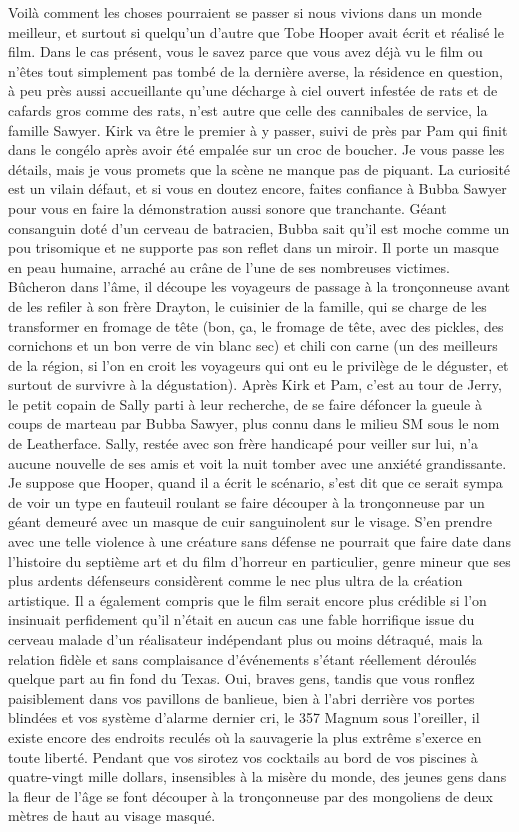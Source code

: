 Voilà comment les choses pourraient se passer si nous vivions dans un monde meilleur, et surtout si quelqu’un d’autre que Tobe Hooper avait écrit et réalisé le film. Dans le cas présent, vous le savez parce que vous avez déjà vu le film ou n’êtes tout simplement pas tombé de la dernière averse, la résidence en question, à peu près aussi accueillante qu’une décharge à ciel ouvert infestée de rats et de cafards gros comme des rats, n’est autre que celle des cannibales de service, la famille Sawyer. Kirk va être le premier à y passer, suivi de près par Pam qui finit dans le congélo après avoir été empalée sur un croc de boucher. Je vous passe les détails, mais je vous promets que la scène ne manque pas de piquant. La curiosité est un vilain défaut, et si vous en doutez encore, faites confiance à Bubba Sawyer pour vous en faire la démonstration aussi sonore que tranchante. Géant consanguin doté d’un cerveau de batracien, Bubba sait qu’il est moche comme un pou trisomique et ne supporte pas son reflet dans un miroir. Il porte un masque en peau humaine, arraché au crâne de l’une de ses nombreuses victimes. Bûcheron dans l’âme, il découpe les voyageurs de passage à la tronçonneuse avant de les refiler à son frère Drayton, le cuisinier de la famille, qui se charge de les transformer en fromage de tête (bon, ça, le fromage de tête, avec des pickles, des cornichons et un bon verre de vin blanc sec) et chili con carne (un des meilleurs de la région, si l’on en croit les voyageurs qui ont eu le privilège de le déguster, et surtout de survivre à la dégustation). Après Kirk et Pam, c’est au tour de Jerry, le petit copain de Sally parti à leur recherche, de se faire défoncer la gueule à coups de marteau par Bubba Sawyer, plus connu dans le milieu SM sous le nom de Leatherface. Sally, restée avec son frère handicapé pour veiller sur lui, n’a aucune nouvelle de ses amis et voit la nuit tomber avec une anxiété grandissante. Je suppose que Hooper, quand il a écrit le scénario, s’est dit que ce serait sympa de voir un type en fauteuil roulant se faire découper à la tronçonneuse par un géant demeuré avec un masque de cuir sanguinolent sur le visage. S’en prendre avec une telle violence à une créature sans défense ne pourrait que faire date dans l’histoire du septième art et du film d’horreur en particulier, genre mineur que ses plus ardents défenseurs considèrent comme le nec plus ultra de la création artistique. Il a également compris que le film serait encore plus crédible si l’on insinuait perfidement qu’il n’était en aucun cas une fable horrifique issue du cerveau malade d’un réalisateur indépendant plus ou moins détraqué, mais la relation fidèle et sans complaisance d’événements s’étant réellement déroulés quelque part au fin fond du Texas. Oui, braves gens, tandis que vous ronflez paisiblement dans vos pavillons de banlieue, bien à l’abri derrière vos portes blindées et vos système d’alarme dernier cri, le 357 Magnum sous l’oreiller, il existe encore des endroits reculés où la sauvagerie la plus extrême s’exerce en toute liberté. Pendant que vos sirotez vos cocktails au bord de vos piscines à quatre-vingt mille dollars, insensibles à la misère du monde, des jeunes gens dans la fleur de l’âge se font découper à la tronçonneuse par des mongoliens de deux mètres de haut au visage masqué. 